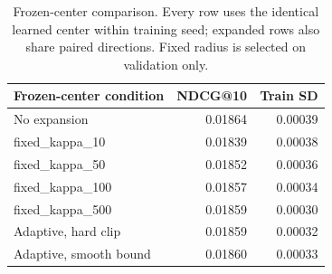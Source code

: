 \begin{table}[t]
\centering\small
\begin{tabular}{lrr}
\toprule
Frozen-center condition & NDCG@10 & Train SD\\
\midrule
No expansion & 0.01864 & 0.00039\\
fixed\_kappa\_10 & 0.01839 & 0.00038\\
fixed\_kappa\_50 & 0.01852 & 0.00036\\
fixed\_kappa\_100 & 0.01857 & 0.00034\\
fixed\_kappa\_500 & 0.01859 & 0.00030\\
Adaptive, hard clip & 0.01859 & 0.00032\\
Adaptive, smooth bound & 0.01860 & 0.00033\\
\bottomrule
\end{tabular}
\caption{Frozen-center comparison. Every row uses the identical learned center within training seed; expanded rows also share paired directions. Fixed radius is selected on validation only.}
\label{tab:frozen-center-radius}
\end{table}
